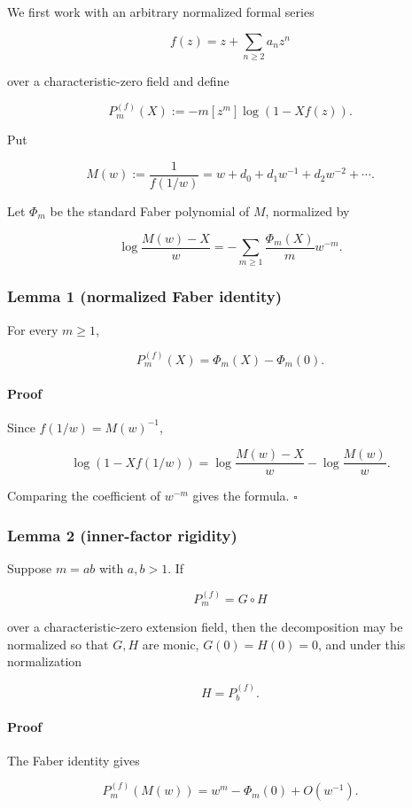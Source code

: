 We first work with an arbitrary normalized formal series

\[
 f(z)=z+\sum_{n\geq2}a_nz^n
\]

over a characteristic-zero field and define

\[
 P_m^{(f)}(X):=-m[z^m]\log(1-Xf(z)).
\]

Put

\[
 M(w):=\frac1{f(1/w)}
 =w+d_0+d_1w^{-1}+d_2w^{-2}+\cdots .
\]

Let \(\Phi_m\) be the standard Faber polynomial of \(M\), normalized by

\[
 \log\frac{M(w)-X}{w}
 =-\sum_{m\geq1}\frac{\Phi_m(X)}m w^{-m}.
\]

\subsubsection{Lemma 1 (normalized Faber identity)}

For every \(m\geq1\),

\[
 P_m^{(f)}(X)=\Phi_m(X)-\Phi_m(0).
\]

\paragraph{Proof}

Since \(f(1/w)=M(w)^{-1}\),

\[
 \log(1-Xf(1/w))
 =\log\frac{M(w)-X}{w}-\log\frac{M(w)}w.
\]

Comparing the coefficient of \(w^{-m}\) gives the formula. \(\square\)

\subsubsection{Lemma 2 (inner-factor rigidity)}

Suppose \(m=ab\) with \(a,b>1\). If

\[
 P_m^{(f)}=G\circ H
\]

over a characteristic-zero extension field, then the decomposition may be
normalized so that \(G,H\) are monic, \(G(0)=H(0)=0\), and under this
normalization

\[
 H=P_b^{(f)}.
\]

\paragraph{Proof}

The Faber identity gives

\[
 P_m^{(f)}(M(w))=w^m-\Phi_m(0)+O(w^{-1}).
\]


